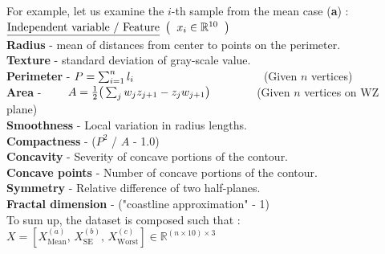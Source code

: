 \documentclass[12pt]{article}
\newcommand\tab[1][1cm]{\hspace*{#1}}
\numberwithin{equation}{section}
\begin{document}
\begin{flushleft}
For example, let us examine the $i$-th sample from the mean case (\textbf{a}) : \\[2mm]
$\underline{\text{Independent variable / Feature}} \,\ \big( \hspace{2mm} x_i \in \mathbb{R}^{10} \hspace{2mm} \big)$  \\ \vspace{2mm}
\tab \textbf{Radius} - mean of distances from center to points on the perimeter. \\
\tab \textbf{Texture} - standard deviation of gray-scale value. \\
\tab \textbf{Perimeter} - $P = \sum_{i=1}^n l_i \hspace{39.25mm}$ (Given  $n$  vertices) \\
\tab \textbf{Area} - $\hspace{7mm} A = \frac{1}{2} \big( \sum_j w_j z_{j+1} - z_{j} w_{j+1} \big) \hspace{1.3cm}$ (Given  $n$  vertices on WZ plane) \\
\tab \textbf{Smoothness} - Local variation in radius lengths. \\
\tab \textbf{Compactness} - ($P^2$ / $A$ - 1.0) \\
\tab \textbf{Concavity} - Severity of concave portions of the contour. \\
\tab \textbf{Concave points} - Number of concave portions of the contour. \\
\tab \textbf{Symmetry} - Relative difference of two half-planes. \\
\tab \textbf{Fractal dimension} - ("coastline approximation" - 1)\\[2mm]
To sum up, the dataset is composed such that : $X = [X^{(a)}_{\text{Mean}}, \, X^{(b)}_{\text{SE}}, \, X^{(c)}_{\text{Worst}}] \in \mathbb{R}^{(n \times 10) \times 3}$


\end{flushleft}
\end{document}
